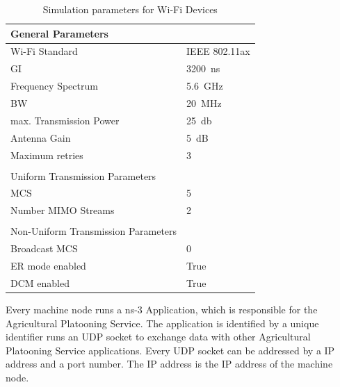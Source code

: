 \begin{table}[H]
	\centering
	\begin{tabular}{p{6cm}p{4cm}}
		General Parameters & \\
		\midrule
		Wi-Fi Standard & IEEE 802.11ax\\
		\ac{GI} & \SI{3200}{\nano\second}\\
		Frequency Spectrum & \SI{5.6}{\giga\hertz}\\
		\ac{BW} & \SI{20}{\mega\hertz}\\
		max. Transmission Power & \SI{25}{\decibel}\\
		Antenna Gain & \SI{5}{\dB}\\
		Maximum retries & \num{3}\\
		 & \\
		Uniform Transmission Parameters & \\
		\midrule
		\ac{MCS} & \num{5}\\
		Number \ac{MIMO} Streams & \num{2}\\
		 & \\
		Non-Uniform Transmission Parameters & \\
		\midrule
		Broadcast \ac{MCS} & \num{0}\\
		\ac{ER} mode enabled & True\\
		\ac{DCM} enabled & True\\
	\end{tabular}
	\caption{Simulation parameters for Wi-Fi Devices}
	\label{tab:SimulationParametersWiFi}
\end{table}

Every machine node runs a ns-3 Application, which is responsible for the Agricultural Platooning Service.
The application is identified by a unique identifier runs an UDP socket to exchange data with other Agricultural Platooning Service applications.
Every UDP socket can be addressed by a IP address and a port number.
The IP address is the IP address of the machine node.

